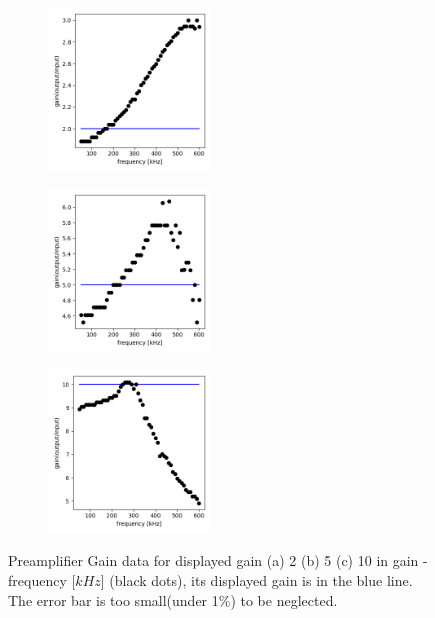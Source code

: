 \documentclass{article}
\begin{document}
 \begin{figure}[H]
    \begin{subfigure}[b]{4.3cm}
        \centering
        \includegraphics[width=4.3cm]{../results/preamplifier_gain_freq_plot(gain2).png}
        \caption{}
    \end{subfigure}
    \hfill
    \begin{subfigure}[b]{4.3cm}
      \centering
      \includegraphics[width=4.3cm]{../results/preamplifier_gain_freq_plot(gain5).png}
      \caption{}
  \end{subfigure}
  \hfill
  \begin{subfigure}[b]{4.3cm}
    \centering
    \includegraphics[width=4.3cm]{../results/preamplifier_gain_freq_plot(gain10).png}
    \caption{}
  \end{subfigure}
  \hfill
    \caption{Preamplifier Gain data for displayed gain (a) 2 (b) 5 (c) 10 in gain - frequency [$kHz$] (black dots),
     its displayed gain is in the blue line. The error bar is too small(under 1\%) to be neglected.
     }
    \label{fig: preamplifier_gain_plot}
  \end{figure}
\end{document}
